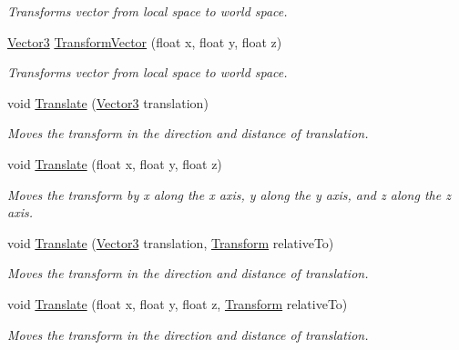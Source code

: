 \begin{DoxyCompactItemize}
\begin{DoxyCompactList}\small\item\em Transforms vector from local space to world space. \end{DoxyCompactList}\item 
\mbox{\hyperlink{class_lua_1_1_vector3}{Vector3}} \mbox{\hyperlink{class_lua_1_1_transform_a79647850468bc87259dda4bc0b70e0ea}{Transform\+Vector}} (float x, float y, float z)
\begin{DoxyCompactList}\small\item\em Transforms vector from local space to world space. \end{DoxyCompactList}\item 
void \mbox{\hyperlink{class_lua_1_1_transform_a1a2933390110217890785619c897df7f}{Translate}} (\mbox{\hyperlink{class_lua_1_1_vector3}{Vector3}} translation)
\begin{DoxyCompactList}\small\item\em Moves the transform in the direction and distance of translation. \end{DoxyCompactList}\item 
void \mbox{\hyperlink{class_lua_1_1_transform_a2edcc9870e4706eff9bd0fe5143ca179}{Translate}} (float x, float y, float z)
\begin{DoxyCompactList}\small\item\em Moves the transform by x along the x axis, y along the y axis, and z along the z axis. \end{DoxyCompactList}\item 
void \mbox{\hyperlink{class_lua_1_1_transform_afa326b1db7b8629826fa763669888dd5}{Translate}} (\mbox{\hyperlink{class_lua_1_1_vector3}{Vector3}} translation, \mbox{\hyperlink{class_lua_1_1_transform}{Transform}} relative\+To)
\begin{DoxyCompactList}\small\item\em Moves the transform in the direction and distance of translation. \end{DoxyCompactList}\item 
void \mbox{\hyperlink{class_lua_1_1_transform_a69bc98e214a973ff53dcb49b48ba06c7}{Translate}} (float x, float y, float z, \mbox{\hyperlink{class_lua_1_1_transform}{Transform}} relative\+To)
\begin{DoxyCompactList}\small\item\em Moves the transform in the direction and distance of translation. \end{DoxyCompactList}\end{DoxyCompactItemize}
